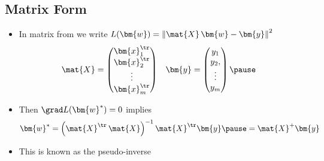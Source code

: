 \begin{slide}
\section{Matrix Form}

\begin{PauseHighLight}
  \begin{itemize}
    \item In matrix from we write $L(\bm{w})= \left\| \mat{X}\,\bm{w} -
      \bm{y} \right\|^2$
    \begin{align*}
      \mat{X} &=
                \begin{pmatrix}
                  \bm{x}_1^\tr \\ \bm{x}_2^\tr \\ \vdots \\ \bm{x}_m^\tr
                \end{pmatrix}
              &
      \bm{y} &=
               \begin{pmatrix}
                 y_1 \\ y_2, \\ \vdots \\ y_m
               \end{pmatrix}\pause
    \end{align*}
  \item Then $\grad L(\bm{w}^*)=0$ implies
    \begin{align*}
      \bm{w}^* = \left(\mat{X}^\tr\,\mat{X}\right)^{-1} \mat{X}^\tr \bm{y}\pause
      = \mat{X}^{+} \bm{y}
    \end{align*}
  \item This is known as the pseudo-inverse\pause
  \end{itemize}
\end{PauseHighLight}

\end{slide}


